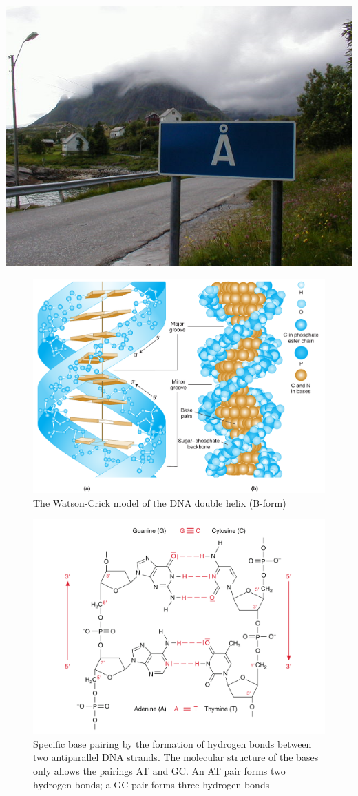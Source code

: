 \documentclass[11pt,ignorenonframetext,aspectratio=169]{beamer}
\begin{document}
\begin{frame}{}
\protect\hypertarget{section-1}{}
\begin{center}\includegraphics[width=0.7\linewidth]{../images/a_place_in_norway} \end{center}
\end{frame}

\begin{frame}{}
\protect\hypertarget{section-2}{}
\begin{figure}
\includegraphics[width=0.65\linewidth]{../images/double_helix_dna} \caption{The Watson-Crick model of the DNA double helix (B-form)}\label{fig:double-helix}
\end{figure}
\end{frame}

\begin{frame}{}
\protect\hypertarget{section-3}{}
\begin{figure}
\includegraphics[width=0.65\linewidth]{../images/complementary_base_pairing} \caption{Specific base pairing by the formation of hydrogen bonds between two antiparallel DNA strands. The molecular structure of the bases only allows the pairings AT and GC. An AT pair forms two hydrogen bonds; a GC pair forms three hydrogen bonds}\label{fig:base-pairing}
\end{figure}
\end{frame}
\end{document}
